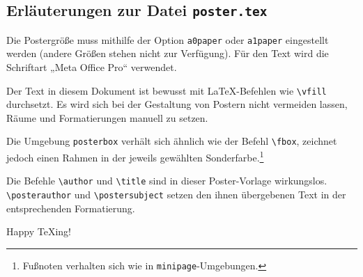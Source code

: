 \documentclass[a1paper, german, ngerman]{article}
\begin{document}

\begin{posterbox}
	\section*{Erläuterungen zur Datei \texttt{poster.tex}}
	Die Postergröße muss mithilfe der Option \texttt{a0paper} oder \texttt{a1paper} eingestellt werden (andere Größen stehen nicht zur Verfügung).
	Für den Text wird die Schriftart „Meta Office Pro“ verwendet.

	Der Text in diesem Dokument ist bewusst mit \LaTeX-Befehlen wie \verb+\vfill+ durchsetzt.
	Es wird sich bei der Gestaltung von Postern nicht vermeiden lassen, Räume und Formatierungen manuell zu setzen.

	Die Umgebung \texttt{posterbox} verhält sich ähnlich wie der Befehl \verb+\fbox+, zeichnet jedoch einen Rahmen in der jeweils gewählten Sonderfarbe.\footnote{%
		Fußnoten verhalten sich wie in \texttt{minipage}-Umgebungen.
	}

	Die Befehle \verb+\author+ und \verb+\title+ sind in dieser Poster-Vorlage wirkungslos.
	\verb+\posterauthor+ und \verb+\postersubject+ setzen den ihnen übergebenen Text in der entsprechenden Formatierung.

	\bigskip

	Happy \TeX{}ing!
\end{posterbox}

\vfill
\end{document}
